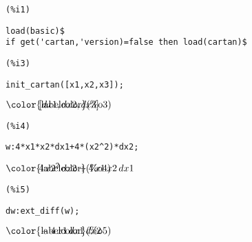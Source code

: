 \noindent
\begin{minipage}[t]{8ex}
\color{red}\bf
\begin{verbatim}
(%i1) 
\end{verbatim}
\end{minipage}
\begin{minipage}[t]{\textwidth}
\color{blue}
\begin{verbatim}
load(basic)$
if get('cartan,'version)=false then load(cartan)$
\end{verbatim}
\end{minipage}


\noindent
\begin{minipage}[t]{8ex}
\color{red}\bf
\begin{verbatim}
(%i3) 
\end{verbatim}
\end{minipage}
\begin{minipage}[t]{\textwidth}
\color{blue}
\begin{verbatim}
init_cartan([x1,x2,x3]);
\end{verbatim}
\end{minipage}
\begin{math}\displaystyle
\parbox{8ex}{\color{labelcolor}(\%o3) }
[dx1,dx2,dx3]
\end{math}


\noindent
\begin{minipage}[t]{8ex}
\color{red}\bf
\begin{verbatim}
(%i4) 
\end{verbatim}
\end{minipage}
\begin{minipage}[t]{\textwidth}
\color{blue}
\begin{verbatim}
w:4*x1*x2*dx1+4*(x2^2)*dx2;
\end{verbatim}
\end{minipage}
\begin{math}\displaystyle
\parbox{8ex}{\color{labelcolor}(\%o4) }
4\,{x2}^{2}\,dx2+4\,x1\,x2\,dx1
\end{math}


\noindent
\begin{minipage}[t]{8ex}
\color{red}\bf
\begin{verbatim}
(%i5) 
\end{verbatim}
\end{minipage}
\begin{minipage}[t]{\textwidth}
\color{blue}
\begin{verbatim}
dw:ext_diff(w);
\end{verbatim}
\end{minipage}
\begin{math}\displaystyle
\parbox{8ex}{\color{labelcolor}(\%o5) }
-4\,x1\,dx1\,dx2
\end{math}


